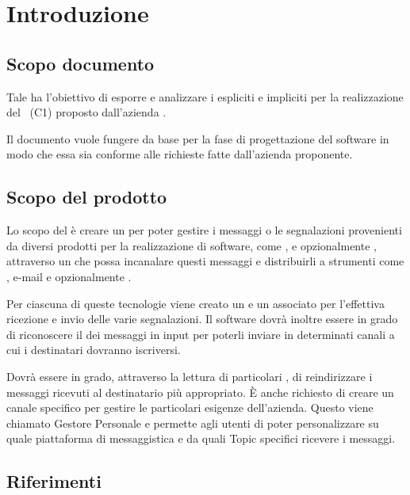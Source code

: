 \newpage
\section{Introduzione}\label{Introduzione}

	

	\subsection{Scopo documento}
	Tale  ha l'obiettivo di esporre e analizzare i  espliciti e impliciti per la realizzazione del  \progetto\ (C1) proposto dall'azienda \II.

	Il documento vuole fungere da base per la fase di progettazione del software in modo che essa sia conforme alle richieste fatte dall'azienda proponente.

    
    \subsection{Scopo del prodotto}
	Lo scopo del  è creare un  per poter gestire i messaggi o le segnalazioni provenienti da diversi prodotti per la realizzazione di software, come ,  e opzionalmente , attraverso un  che possa incanalare questi messaggi e distribuirli a strumenti come , e-mail e opzionalmente .\par
	Per ciascuna di queste tecnologie viene creato un  e un  associato per l'effettiva ricezione e invio delle varie segnalazioni.
	Il software dovrà inoltre essere in grado di riconoscere il  dei messaggi in input per poterli inviare in determinati canali a cui i
	destinatari dovranno iscriversi.\par
	Dovrà essere in grado, attraverso la lettura di	particolari	, di reindirizzare i messaggi ricevuti al destinatario più appropriato. 
	\`E anche richiesto di creare un canale specifico per gestire le particolari esigenze dell'azienda. 
	Questo viene chiamato Gestore Personale e permette agli utenti di poter personalizzare su quale piattaforma di messaggistica e da quali Topic specifici ricevere i messaggi.

	\subsection{Riferimenti}

